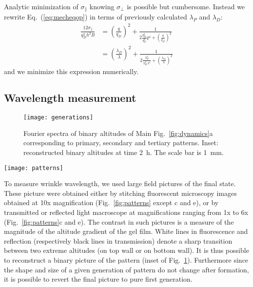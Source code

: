 \documentclass[twocolumn,superscriptaddress,showpacs,preprintnumbers,
amsmath,amssymb,prl]{revtex4-1}
\begin{document}
Analytic minimization of $\sigma_\parallel$ knowing $\sigma_\perp$ is possible but cumbersome. Instead we rewrite Eq.~(\ref{eq:mecheqop}) in terms of previously calculated $\lambda_P$ and $\lambda_D$:
\begin{align}
\frac{12\sigma_\parallel}{q_D^2 h^2 B} &= \left(\frac{q}{q_D}\right)^2 + \frac{1}{2\frac{q_D^2}{q_P^6}q^4  + \left(\frac{q}{q_D}\right)^2}\\
&= \left(\frac{\lambda_D}{\lambda}\right)^2 + \frac{1}{2\frac{\lambda_P^6}{\lambda_D^2\lambda^4}  + \left(\frac{\lambda_D}{\lambda}\right)^2}
\end{align}
and we minimize this expression numerically.

\subsection*{Wavelength measurement}

\begin{figure}
	\texttt{[image: generations]}%
	\caption{Fourier spectra of binary altitudes of Main Fig.~\ref{fig:dynamics}a corresponding to primary, secondary and tertiary patterns. Inset: reconstructed binary altitudes at time \SI{2}{\hour}. The scale bar is \SI{1}{\milli\metre}.}%
	\label{fig:generations}%
\end{figure}

\begin{figure*}
	\texttt{[image: patterns]}
	\caption{Patterns corresponding to the samples of Supplementary Table~\ref{tab:data} of the main text. (a-d) increasing cell thickness. (e-f) larger solid content. (g-i) increasing glycerol content. All pictures are stitching of fluorescent microscopy images except (c,e) which are details of reflected light macroscope images. The scale is common to all panels (scale bar \SI{1}{\milli\metre}). Length of arrows correspond to the measured primary wavelength.}
	\label{fig:patterns}
\end{figure*}

To measure wrinkle wavelength, we used large field pictures of the final state. These picture were obtained either by stitching fluorescent microscopy images obtained at 10x magnification (Fig.~\ref{fig:patterns} except c and e), or by transmitted or reflected light macroscope at magnifications ranging from 1x to 6x (Fig.~\ref{fig:patterns}c and e). The contrast in such pictures is a measure of the magnitude of the altitude gradient of the gel film. White lines in fluorescence and reflection (respectively black lines in transmission) denote a sharp transition between two extreme altitudes (on top wall or on bottom wall). It is thus possible to reconstruct a binary picture of the pattern (inset of Fig.~\ref{fig:generations}). Furthermore since the shape and size of a given generation of pattern do not change after formation, it is possible to revert the final picture to pure first generation.
\end{document}
